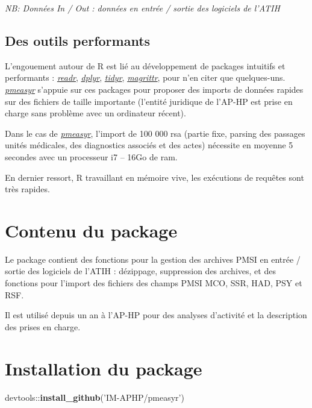 \documentclass[]{book}
\newenvironment{Shaded}{\begin{snugshade}}{\end{snugshade}}
\newcommand{\KeywordTok}[1]{\textcolor[rgb]{0.13,0.29,0.53}{\textbf{{#1}}}}
\newcommand{\StringTok}[1]{\textcolor[rgb]{0.31,0.60,0.02}{{#1}}}
\newcommand{\NormalTok}[1]{{#1}}
\begin{document}
\emph{NB: Données In / Out : données en entrée / sortie des logiciels de
l'ATIH}

\subsection{Des outils performants}\label{des-outils-performants}

L'engouement autour de R est lié au développement de packages intuitifs
et performants : \href{http://readr.tidyverse.org}{\emph{readr}},
\href{https://github.com/hadley/dplyr}{\emph{dplyr}},
\href{http://tidyr.tidyverse.org}{\emph{tidyr}},
\href{https://github.com/tidyverse/magrittr}{\emph{magrittr}}, pour n'en
citer que quelques-uns.
\href{https://github.com/IM-APHP/pmeasyr}{\emph{pmeasyr}} s'appuie sur
ces packages pour proposer des imports de données rapides sur des
fichiers de taille importante (l'entité juridique de l'AP-HP est prise
en charge sans problème avec un ordinateur récent).

Dans le cas de
\href{https://github.com/IM-APHP/pmeasyr}{\emph{pmeasyr}}, l'import de
100 000 rsa (partie fixe, parsing des passages unités médicales, des
diagnostics associés et des actes) nécessite en moyenne 5 secondes avec
un processeur i7 -- 16Go de ram.

En dernier ressort, R travaillant en mémoire vive, les exécutions de
requêtes sont très rapides.

\section{Contenu du package}\label{contenu-du-package}

Le package contient des fonctions pour la gestion des archives PMSI en
entrée / sortie des logiciels de l'ATIH : dézippage, suppression des
archives, et des fonctions pour l'import des fichiers des champs PMSI
MCO, SSR, HAD, PSY et RSF.

Il est utilisé depuis un an à l'AP-HP pour des analyses d'activité et la
description des prises en charge.

\section{Installation du package}\label{installation-du-package}

\begin{Shaded}
\begin{Highlighting}[]
\NormalTok{devtools::}\KeywordTok{install_github}\NormalTok{(}\StringTok{'IM-APHP/pmeasyr'}\NormalTok{)}
\end{Highlighting}
\end{Shaded}
\end{document}
